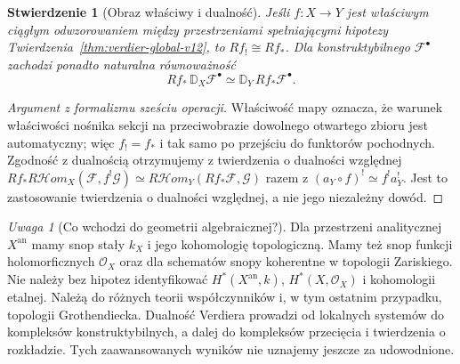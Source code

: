 \documentclass[11pt,a4paper,oneside]{report}
\theoremstyle{plain}
\newtheorem{stwierdzenie}[twierdzenie]{Stwierdzenie}
\theoremstyle{definition}
\theoremstyle{remark}
\newtheorem{uwaga}[twierdzenie]{Uwaga}
\begin{document}
\begin{stwierdzenie}[Obraz właściwy i dualność]
\label{prop:verdier-proper-v12}
Jeśli $f:X\to Y$ jest właściwym ciągłym odwzorowaniem
między przestrzeniami spełniającymi hipotezy
Twierdzenia~\ref{thm:verdier-global-v12}, to
$Rf_!\cong Rf_*$. Dla konstruktybilnego
$\mathcal F^\bullet$ zachodzi ponadto naturalna
równoważność
\[
Rf_*\,\mathbb D_X\mathcal F^\bullet
\simeq\mathbb D_Y\,Rf_*\mathcal F^\bullet.
\]
\end{stwierdzenie}
\begin{proof}[Argument z formalizmu sześciu operacji]
Właściwość mapy oznacza, że warunek właściwości
nośnika sekcji na przeciwobrazie dowolnego otwartego
zbioru jest automatyczny; więc $f_!=f_*$ i tak samo
po przejściu do funktorów pochodnych. Zgodność z dualnością
otrzymujemy z twierdzenia o dualności względnej
$Rf_*R\mathcal Hom_X(\mathcal F,f^!\mathcal G)
\simeq R\mathcal Hom_Y(Rf_*\mathcal F,\mathcal G)$
razem z $(a_Y\circ f)^!\simeq f^!a_Y^!$.
Jest to zastosowanie twierdzenia o dualności względnej,
a nie jego niezależny dowód.
\end{proof}

\begin{uwaga}[Co wchodzi do geometrii algebraicznej?]
Dla przestrzeni analitycznej $X^{\mathrm{an}}$ mamy snop
stały $k_X$ i jego kohomologię topologiczną. Mamy też
snop funkcji holomorficznych $\mathcal O_X$ oraz dla
schematów snopy koherentne w topologii Zariskiego.
Nie należy bez hipotez identyfikować
$H^*(X^{\mathrm{an}},k)$, $H^*(X,\mathcal O_X)$
i kohomologii etalnej. Należą do różnych teorii
współczynników i, w tym ostatnim przypadku,
topologii Grothendiecka. Dualność Verdiera prowadzi
od lokalnych systemów do kompleksów konstruktybilnych,
a dalej do kompleksów przecięcia i twierdzenia o rozkładzie.
Tych zaawansowanych wyników nie uznajemy jeszcze za udowodnione.
\end{uwaga}
\end{document}
